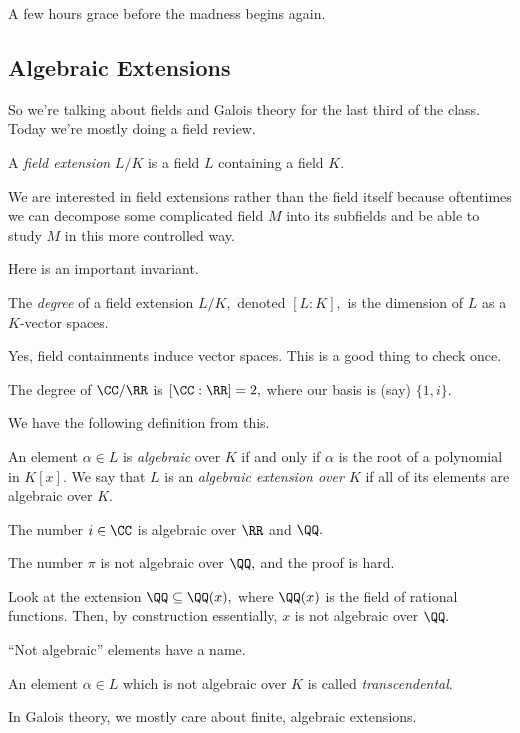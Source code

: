 

















A few hours grace before the madness begins again.

\subsection{Algebraic Extensions}
So we're talking about fields and Galois theory for the last third of the class. Today we're mostly doing a field review.
\begin{definition}
	A \textit{field extension} $L/K$ is a field $L$ containing a field $K.$
\end{definition}
We are interested in field extensions rather than the field itself because oftentimes we can decompose some complicated field $M$ into its subfields and be able to study $M$ in this more controlled way.

Here is an important invariant.
\begin{definition}[Degree]
	The \textit{degree} of a field extension $L/K,$ denoted $[L:K],$ is the dimension of $L$ as a $K$-vector spaces.
\end{definition}
\begin{remark}
	Yes, field containments induce vector spaces. This is a good thing to check once.
\end{remark}
\begin{example}
	The degree of $\CC/\RR$ is $[\CC:\RR]=2,$ where our basis is (say) $\{1,i\}.$
\end{example}
We have the following definition from this.
\begin{definition}[Algebraic]
	An element $\alpha\in L$ is \textit{algebraic} over $K$ if and only if $\alpha$ is the root of a polynomial in $K[x].$ We say that $L$ is an \textit{algebraic extension over $K$} if all of its elements are algebraic over $K.$
\end{definition}
\begin{example}
	The number $i\in\CC$ is algebraic over $\RR$ and $\QQ.$
\end{example}
\begin{nex}
	The number $\pi$ is not algebraic over $\QQ,$ and the proof is hard.
\end{nex}
\begin{nex}
	Look at the extension $\QQ\subseteq\QQ(x),$ where $\QQ(x)$ is the field of rational functions. Then, by construction essentially, $x$ is not algebraic over $\QQ.$
\end{nex}
``Not algebraic'' elements have a name.
\begin{definition}[Transcendental]
	An element $\alpha\in L$ which is not algebraic over $K$ is called \textit{transcendental}.
\end{definition}
In Galois theory, we mostly care about finite, algebraic extensions.


